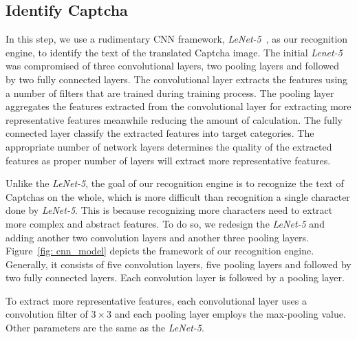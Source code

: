 \subsection{Identify Captcha}
In this step, we use a rudimentary CNN framework, \emph{LeNet-5}~\cite{Lecun1998Gradient}, as our recognition engine, to identify the text of the translated Captcha image.
The initial \emph{Lenet-5} was compromised of three convolutional layers, two pooling layers and followed by two fully connected layers.
The convolutional layer extracts the features using a number of filters that are trained during training process. The pooling layer aggregates the features extracted from the convolutional layer for extracting more representative features meanwhile reducing the amount of calculation. The fully connected layer classify the extracted features into target categories. The appropriate number of network layers determines the quality of the extracted features as proper number of layers will extract more representative features.

Unlike the \emph{LeNet-5}, the goal of our recognition engine is to recognize the text of Captchas on the whole, which is more difficult than recognition a single character done by \emph{LeNet-5}. This is because recognizing more characters need to extract more complex and abstract features.
To do so, we redesign the \emph{LeNet-5} and adding another two convolution layers and another three pooling layers.
Figure~\ref{fig: cnn_model} depicts the framework of our recognition engine. Generally, it consists of five convolution layers, five pooling layers and followed by two fully connected layers. Each convolution layer is followed by a pooling layer.

To extract more representative features, each convolutional layer uses a convolution filter of $3 \times 3$ and each pooling layer employs the max-pooling value. Other parameters are the same as the \emph{LeNet-5}.












